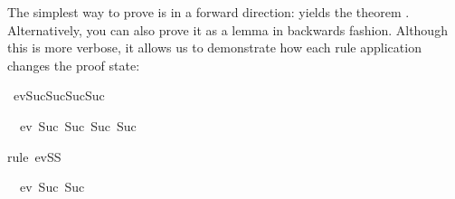 \begin{isabellebody}
\begin{isamarkuptext}
The simplest way to prove  is in a forward
direction:  yields the theorem . Alternatively, you can also prove it as a lemma in backwards
fashion. Although this is more verbose, it allows us to demonstrate how each
rule application changes the proof state:%
\end{isamarkuptext}%
\isamarkuptrue%
\isamarkupfalse%
\ {}ev{}Suc{}Suc{}Suc{}Suc\ {}{}{}{}{}{}%
\isadelimproof
%
\endisadelimproof
%
\isatagproof
%
\begin{isamarkuptxt}%
\begin{isabelle}%
\ {}{}\ ev\ {}Suc\ {}Suc\ {}Suc\ {}Suc\ {}{}{}{}{}%
\end{isabelle}%
\end{isamarkuptxt}%
\isamarkuptrue%
\isamarkupfalse%
{}rule\ evSS{}%
\begin{isamarkuptxt}%
\begin{isabelle}%
\ {}{}\ ev\ {}Suc\ {}Suc\ {}{}{}%

\end{isabelle}
\end{isamarkuptxt}
\end{isabellebody}
